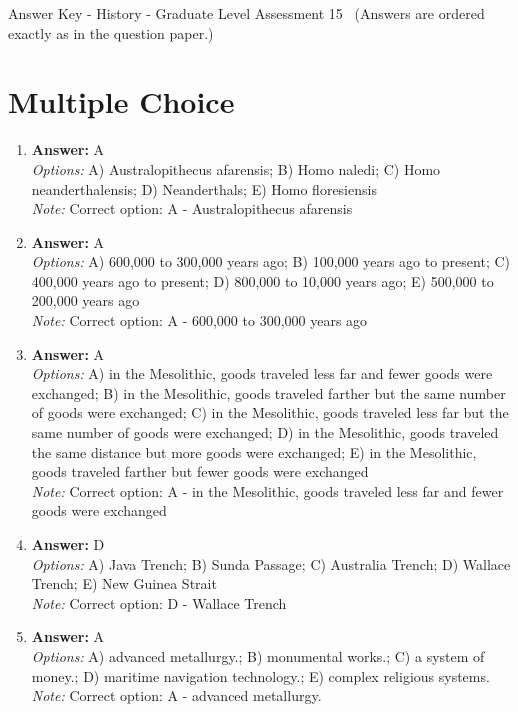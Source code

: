 \documentclass[12pt]{article}
\begin{document}
\begin{center}
Answer Key - History - Graduate Level Assessment 15 \
\small (Answers are ordered exactly as in the question paper.)
\end{center}

\section*{Multiple Choice}
\begin{enumerate}[label=\arabic*.]
\item \textbf{Answer:} A
\\ \textit{Options:} A) Australopithecus afarensis; B) Homo naledi; C) Homo neanderthalensis; D) Neanderthals; E) Homo floresiensis
\\ \textit{Note:} Correct option: A - Australopithecus afarensis
\item \textbf{Answer:} A
\\ \textit{Options:} A) 600,000 to 300,000 years ago; B) 100,000 years ago to present; C) 400,000 years ago to present; D) 800,000 to 10,000 years ago; E) 500,000 to 200,000 years ago
\\ \textit{Note:} Correct option: A - 600,000 to 300,000 years ago
\item \textbf{Answer:} A
\\ \textit{Options:} A) in the Mesolithic, goods traveled less far and fewer goods were exchanged; B) in the Mesolithic, goods traveled farther but the same number of goods were exchanged; C) in the Mesolithic, goods traveled less far but the same number of goods were exchanged; D) in the Mesolithic, goods traveled the same distance but more goods were exchanged; E) in the Mesolithic, goods traveled farther but fewer goods were exchanged
\\ \textit{Note:} Correct option: A - in the Mesolithic, goods traveled less far and fewer goods were exchanged
\item \textbf{Answer:} D
\\ \textit{Options:} A) Java Trench; B) Sunda Passage; C) Australia Trench; D) Wallace Trench; E) New Guinea Strait
\\ \textit{Note:} Correct option: D - Wallace Trench
\item \textbf{Answer:} A
\\ \textit{Options:} A) advanced metallurgy.; B) monumental works.; C) a system of money.; D) maritime navigation technology.; E) complex religious systems.
\\ \textit{Note:} Correct option: A - advanced metallurgy.
\end{enumerate}
\end{document}
